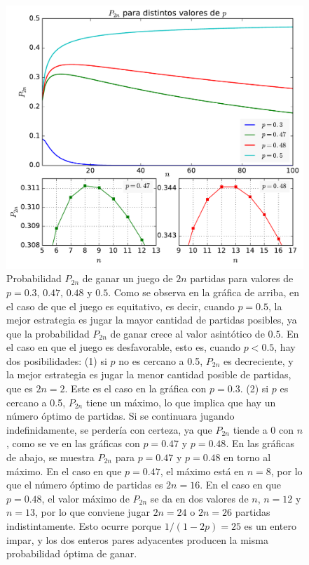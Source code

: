 \documentclass[a4paper]{report}
\begin{document}
\begin{figure}[!htb]
\begin{center}
\includegraphics[width=0.9\columnwidth]{figuras/unfair_win_probabilities_v2.pdf}
\caption{\label{fig:unfair_win_probabilities} Probabilidad \(P_{2n}\) de ganar un juego de \(2n\) partidas para valores de \(p=0.3,\, 0.47,\, 0.48\) y \(0.5\). Como se observa en la gráfica de arriba, en el caso de que el juego es equitativo, es decir, cuando \(p=0.5\), la mejor estrategia es jugar la mayor cantidad de partidas posibles, ya que la probabilidad \(P_{2n}\) de ganar crece al valor asintótico de \(0.5\). En el caso en que el juego es desfavorable, esto es, cuando \(p<0.5\), hay dos posibilidades: (1) si \(p\) no es cercano a 0.5, \(P_{2n}\) es decreciente, y la mejor estrategia es jugar la menor cantidad posible de partidas, que es \(2n=2\). Este es el caso en la gráfica con \(p=0.3\). (2) si \(p\) es cercano a 0.5, \(P_{2n}\) tiene un máximo, lo que implica que hay un número óptimo de partidas. Si se continuara jugando indefinidamente, se perdería con certeza, ya que \(P_{2n}\) tiende a \(0\) con \(n\), como se ve en las gráficas con \(p=0.47\) y \(p=0.48\). En las gráficas de abajo, se muestra \(P_{2n}\) para \(p=0.47\) y \(p=0.48\) en torno al máximo. En el caso en que \(p=0.47\), el máximo está en \(n=8\), por lo que el número óptimo de partidas es \(2n=16\). En el caso en que \(p=0.48\), el valor máximo de \(P_{2n}\) se da en dos valores de \(n\), \(n=12\) y \(n=13\), por lo que conviene jugar \(2n=24\) o \(2n=26\) partidas indistintamente. Esto ocurre porque \(1/(1-2p)=25\) es un entero impar, y los dos enteros pares adyacentes producen la misma probabilidad óptima de ganar.}
\end{center}
\end{figure}
\end{document}
